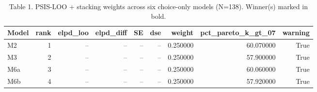 \begin{table}[ht]
\centering
\caption{Table 1. PSIS-LOO + stacking weights across six choice-only models (N=138). Winner(s) marked in bold.}
\label{tbl-loo-stacking}
\begin{tabular}{lrrrrrrrr}
\toprule
Model & rank & elpd\_loo & elpd\_diff & SE & dse & weight & pct\_pareto\_k\_gt\_07 & warning \\
\midrule
M2 & 1 & -- & -- & -- & -- & 0.250000 & 60.070000 & True \\
M3 & 2 & -- & -- & -- & -- & 0.250000 & 57.900000 & True \\
M6a & 3 & -- & -- & -- & -- & 0.250000 & 60.060000 & True \\
M6b & 4 & -- & -- & -- & -- & 0.250000 & 57.920000 & True \\
\bottomrule
\end{tabular}
\end{table}

